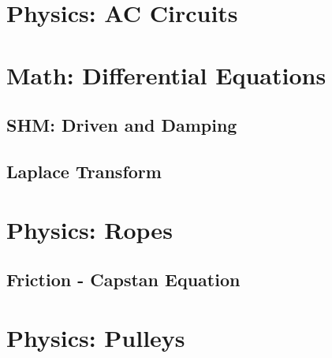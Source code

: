 \documentclass{article}
\begin{document}
\section{Physics: AC Circuits}

\section{Math: Differential Equations}
\subsection{SHM: Driven and Damping}
\subsection{Laplace Transform}

\section{Physics: Ropes}
\subsection{Friction - Capstan Equation}
\section{Physics: Pulleys}
\end{document}

